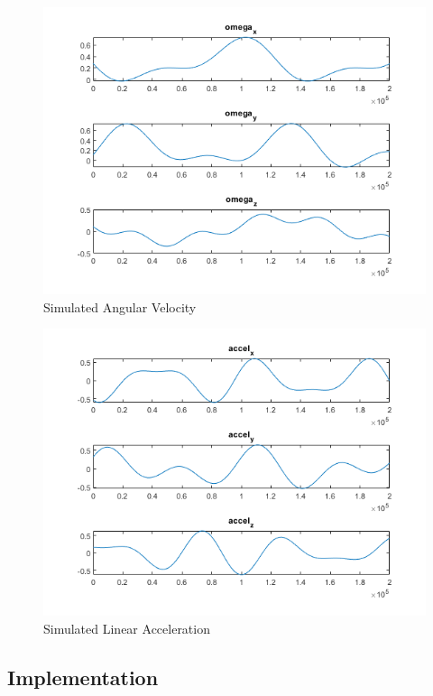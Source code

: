 \documentclass[conference]{IEEEtran}
\begin{document}
\begin{figure}
    \centering
    \includegraphics[width=0.85\linewidth]{figures/simulated_omega.png}
    \caption{Simulated Angular Velocity}
    \label{fig:omega}
\end{figure}
\begin{figure}
    \centering
    \includegraphics[width=0.85\linewidth]{figures/simulated_accel.png}
    \caption{Simulated Linear Acceleration}
    \label{fig:accel}
\end{figure}

\subsection{Implementation}
\end{document}
